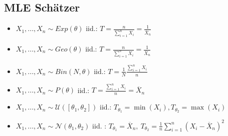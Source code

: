\subsection{MLE Schätzer}
\begin{itemize}
	\item $X_1, ..., X_n \sim Exp(\theta)$ iid.: $T = \frac{n}{\sum_{i=1}^n X_i} = \frac{1}{\overline{X}_n}$
	\item $X_1, ..., X_n \sim Geo(\theta)$ iid.: $T = \frac{n}{\sum_{i=1}^n X_i} = \frac{1}{\overline{X}_n}$
	\item $X_1, ..., X_n \sim Bin(N, \theta)$ iid.: $T = \frac{1}{N}\frac{\sum_{i = 1}^n X_i}{n}$
	\item $X_1, ..., X_n \sim P(\theta)$ iid.: $T = \frac{\sum_{i = 1}^n X_i}{n} = \overline{X}_n$
	\item $X_1, ..., X_n \sim \mathcal{U}([\theta_1, \theta_2])$ iid.: $T_{\theta_1} = \min(X_i), T_{\theta_2} = \max(X_i)$
	\item $X_1, ..., X_n \sim \mathcal{N}(\theta_1, \theta_2)$ iid. : $T_{\theta_1} = \overline{X}_n, \ T_{\theta_2} = \frac{1}{n}\sum_{i=1}^n (X_i - \overline{X}_n)^2$
\end{itemize}

\clearpage

